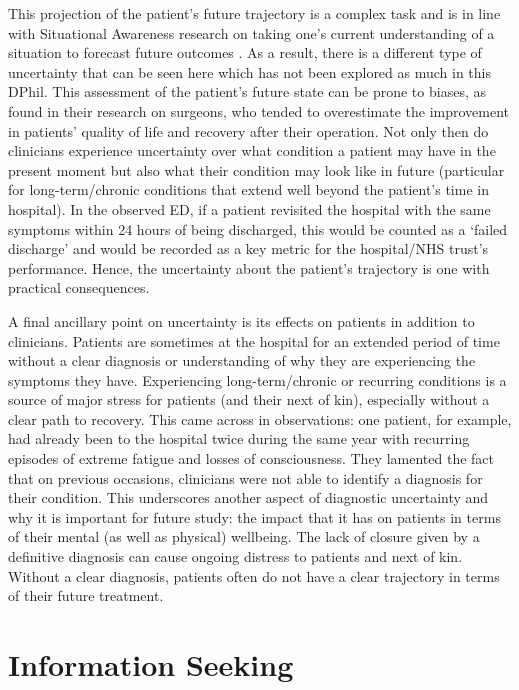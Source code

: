 \documentclass[a4paper, nobind]{templates/ociamthesis}
\begin{document}
\hfill\break
This projection of the patient's future trajectory is a complex task and is in line with Situational Awareness research on taking one's current understanding of a situation to forecast future outcomes \autocite{endsley_toward_1995}. As a result, there is a different type of uncertainty that can be seen here which has not been explored as much in this DPhil. This assessment of the patient's future state can be prone to biases, as \textcite{graz_prognosis_2005} found in their research on surgeons, who tended to overestimate the improvement in patients' quality of life and recovery after their operation. Not only then do clinicians experience uncertainty over what condition a patient may have in the present moment but also what their condition may look like in future (particular for long-term/chronic conditions that extend well beyond the patient's time in hospital). In the observed ED, if a patient revisited the hospital with the same symptoms within 24 hours of being discharged, this would be counted as a `failed discharge' and would be recorded as a key metric for the hospital/NHS trust's performance. Hence, the uncertainty about the patient's trajectory is one with practical consequences.

\hfill\break
A final ancillary point on uncertainty is its effects on patients in addition to clinicians. Patients are sometimes at the hospital for an extended period of time without a clear diagnosis or understanding of why they are experiencing the symptoms they have. Experiencing long-term/chronic or recurring conditions is a source of major stress for patients (and their next of kin), especially without a clear path to recovery. This came across in observations: one patient, for example, had already been to the hospital twice during the same year with recurring episodes of extreme fatigue and losses of consciousness. They lamented the fact that on previous occasions, clinicians were not able to identify a diagnosis for their condition. This underscores another aspect of diagnostic uncertainty and why it is important for future study: the impact that it has on patients in terms of their mental (as well as physical) wellbeing. The lack of closure given by a definitive diagnosis can cause ongoing distress to patients and next of kin. Without a clear diagnosis, patients often do not have a clear trajectory in terms of their future treatment.

\section*{Information Seeking}\label{information-seeking-1}
\end{document}
